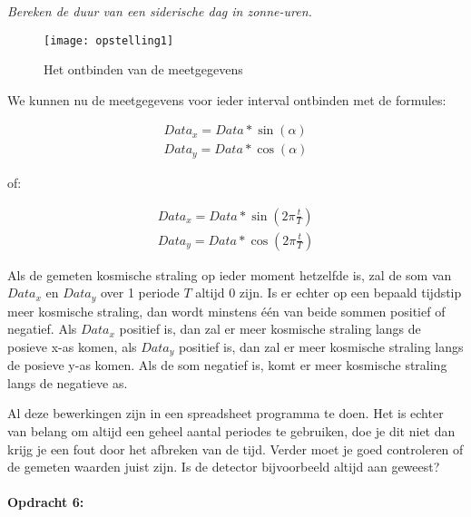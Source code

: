 \emph{Bereken de duur van een siderische dag in zonne-uren.}

\begin{figure}[h]
\noindent \begin{centering}
\texttt{[image: opstelling1]}
\par\end{centering}

\caption{Het ontbinden van de meetgegevens}
\end{figure}


We kunnen nu de meetgegevens voor ieder interval ontbinden met de
formules:

\begin{equation}
\begin{array}{c}
Data_{x}=Data*\sin(\alpha)\\
Data_{y}=Data*\cos(\alpha)
\end{array}
\end{equation}


of:

\begin{equation}
\begin{array}{c}
Data_{x}=Data*\sin(2\pi\frac{t}{T})\\
Data_{y}=Data*\cos(2\pi\frac{t}{T})
\end{array}
\end{equation}


Als de gemeten kosmische straling op ieder moment hetzelfde is, zal
de som van $Data_{x}$ en $Data_{y}$ over 1 periode $T$ altijd 0
zijn. Is er echter op een bepaald tijdstip meer kosmische straling,
dan wordt minstens één van beide sommen positief of negatief. Als
$Data_{x}$ positief is, dan zal er meer kosmische straling langs
de posieve x-as komen, als $Data_{y}$ positief is, dan zal er meer
kosmische straling langs de posieve y-as komen. Als de som negatief
is, komt er meer kosmische straling langs de negatieve as.

Al deze bewerkingen zijn in een spreadsheet programma te doen. Het
is echter van belang om altijd een geheel aantal periodes te gebruiken,
doe je dit niet dan krijg je een fout door het afbreken van de tijd.
Verder moet je goed controleren of de gemeten waarden juist zijn.
Is de detector bijvoorbeeld altijd aan geweest? 


\paragraph*{Opdracht 6:}

